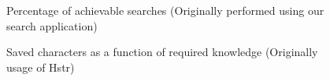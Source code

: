 \begin{figure}[h!]
\centering
{}
\caption{Percentage of achievable searches (Originally performed using our search application)}
\label{eval-metrics-plot-cmds-resh}
\end{figure}



\begin{figure}[h!]
\centering
{}
\caption{Saved characters as a function of required knowledge (Originally usage of Hstr)}
\label{eval-metrics-plot-chars-hstr}
\end{figure}


